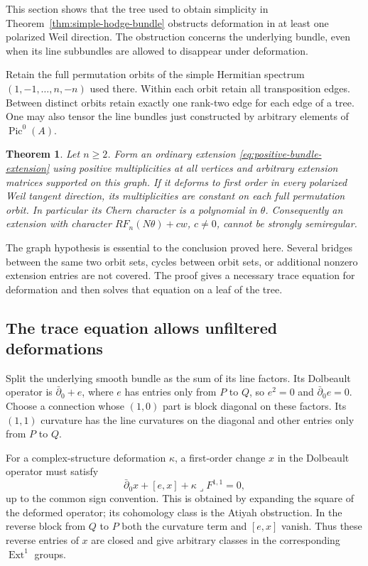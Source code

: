 \documentclass[11pt]{article}
\newtheorem{theorem}{Theorem}[section]
\theoremstyle{definition}
\theoremstyle{remark}
\begin{document}
This section shows that the tree used to obtain simplicity in
Theorem~\ref{thm:simple-hodge-bundle} obstructs deformation in at
least one polarized Weil direction.  The obstruction concerns the
underlying bundle, even when its line subbundles are allowed to
disappear under deformation.

Retain the full permutation orbits of the simple Hermitian spectrum
$(1,-1,\ldots,n,-n)$ used there.  Within each orbit retain all
transposition edges.  Between distinct orbits retain exactly one
rank-two edge for each edge of a tree.  One may also tensor the
line bundles just constructed by arbitrary elements of
$\operatorname{Pic}^0(A)$.

\begin{theorem}\label{thm:tree-extension-obstruction}
Let $n\ge2$.  Form an ordinary extension
\eqref{eq:positive-bundle-extension} using positive multiplicities
at all vertices and arbitrary extension matrices supported on this
graph.  If it deforms to first order in every polarized Weil tangent
direction, its multiplicities are constant on each full permutation
orbit.  In particular its Chern character is a polynomial in $\theta$.
Consequently an extension with character
$R F_n(N\theta)+cw$, $c\ne0$, cannot be strongly semiregular.
\end{theorem}

The graph hypothesis is essential to the conclusion proved here.
Several bridges between the same two orbit sets, cycles between
orbit sets, or additional nonzero extension entries are not covered.
The proof gives a necessary trace equation for deformation and then
solves that equation on a leaf of the tree.

\subsection{The trace equation allows unfiltered deformations}

Split the underlying smooth bundle as the sum of its line factors.
Its Dolbeault operator is $\bar\partial_0+e$, where $e$ has entries
only from $P$ to $Q$, so $e^2=0$ and $\bar\partial_0e=0$.
Choose a connection whose $(1,0)$ part is block diagonal on these
factors.  Its $(1,1)$ curvature has the line curvatures on the
diagonal and other entries only from $P$ to $Q$.

For a complex-structure deformation $\kappa$, a first-order change
$x$ in the Dolbeault operator must satisfy
\begin{equation}
 \bar\partial_0x+[e,x]+\kappa\lrcorner F^{1,1}=0,
 \label{eq:tree-atiyah}
\end{equation}
up to the common sign convention.  This is obtained by expanding
the square of the deformed operator; its cohomology class is the
Atiyah obstruction.  In the reverse block from $Q$ to $P$ both the
curvature term and $[e,x]$ vanish.  Thus these reverse entries of
$x$ are closed and give arbitrary classes in the corresponding
$\operatorname{Ext}^1$ groups.
\end{document}
